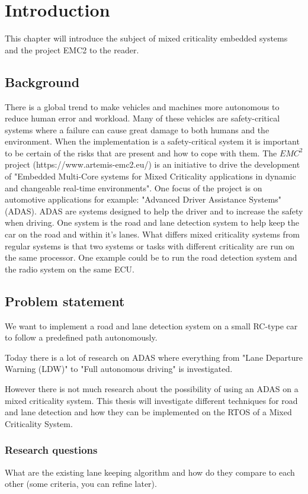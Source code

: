 \chapter{Introduction}
\label{sec:introduction}
This chapter will introduce the subject of mixed criticality embedded systems and the project EMC2 to the reader.

\section{Background}
There is a global trend to make vehicles and machines more autonomous to reduce human error and workload. Many of these vehicles are safety-critical systems where a failure can cause great damage to both humans and the environment. When the implementation is a safety-critical system it is important to be certain of the risks that are present and how to cope with them. The $EMC^2$ project (https://www.artemis-emc2.eu/) is an initiative to drive the development of "Embedded Multi-Core systems for Mixed Criticality applications in dynamic and changeable real-time environments". One focus of the project is on automotive applications for example: "Advanced Driver Assistance Systems" (ADAS). ADAS are systems designed to help the driver and to increase the safety when driving. One system is the road and lane detection system to help keep the car on the road and within it's lanes. What differs mixed criticality systems from regular systems is that two systems or tasks with different criticality are run on the same processor. One example could be to run the road detection system and the radio system on the same ECU. 


\section{Problem statement}
We want to implement a road and lane detection system on a small RC-type car to follow a predefined path autonomously. 

Today there is a lot of research on ADAS where everything from "Lane Departure Warning (LDW)" to "Full autonomous driving" is investigated. 

However there is not much research about the possibility of using an ADAS on a mixed criticality system. This thesis will investigate different techniques for road and lane detection and how they can be implemented on the RTOS of a Mixed Criticality System.


\subsection{Research questions}
What are the existing lane keeping algorithm and how do they compare to each other (some criteria, you can refine later).\\

